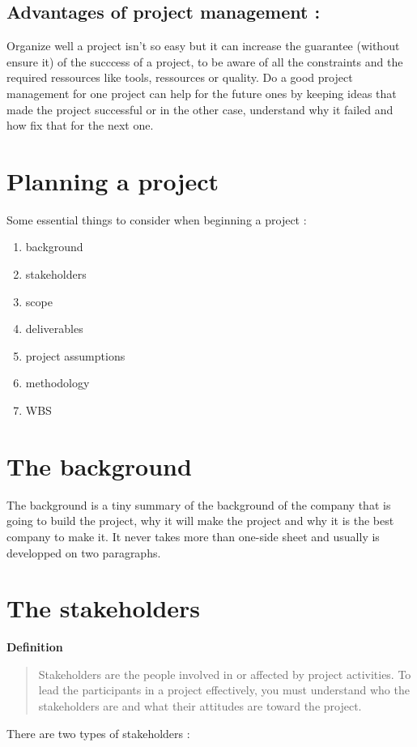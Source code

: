 \documentclass{article}
\begin{document}
\subsection{Advantages of project management :}
Organize well a project isn't so easy but it can increase the guarantee (without ensure it) of the succcess of a project, to be aware of all the constraints and the required ressources like tools, ressources or quality. Do a good project management for one project can help for the future ones by keeping ideas that made the project successful or in the other case, understand why it failed and how fix that for the next one.


\newpage
\section{Planning a project}
Some essential things to consider when beginning a project :
\begin{enumerate}
    \item background
    \item stakeholders
    \item scope
    \item deliverables
    \item project assumptions
    \item methodology
    \item WBS
\end{enumerate}

\section{The background}
The background is a tiny summary of the background of the company that is going to build the project, why it will make the project and why it is the best company to make it. It never takes more than one-side sheet and usually is developped on two paragraphs.

\section{The stakeholders}
\textbf{Definition}
\begin{quote}
	Stakeholders are the people involved in or affected by project activities. To lead the participants in a project effectively, you must understand who the stakeholders are and what their attitudes are toward the project.
\end{quote}


There are two types of stakeholders :
\end{document}
